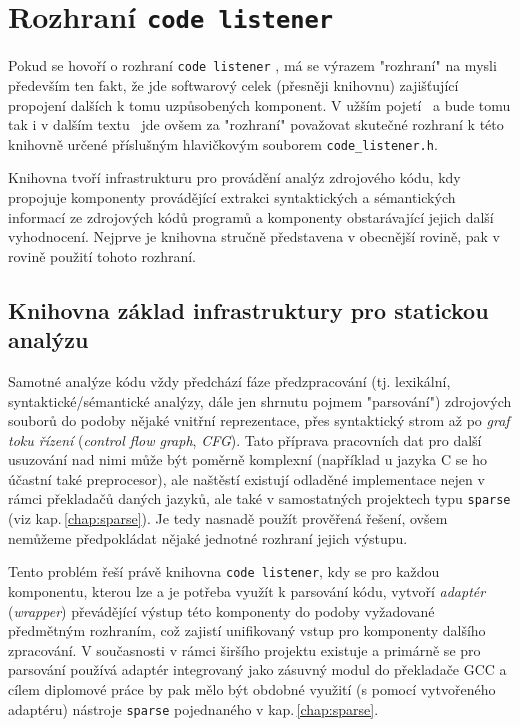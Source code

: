 \chapter{Rozhraní \texttt{code listener}}
\label{chap:code-listener}

Pokud se hovoří o rozhraní \texttt{code listener} \cite{web:FITVUTBR:VeriFIT:CodeListener},
má se výrazem "rozhraní" na mysli především ten fakt, že jde softwarový
celek (přesněji knihovnu) zajišťující propojení dalších k tomu uzpůsobených
komponent. V užším pojetí \ndash\ a bude tomu tak i v dalším textu \ndash\ jde ovšem
za "rozhraní" považovat skutečné rozhraní k této knihovně určené
příslušným hlavičkovým souborem \texttt{code\_listener.h}.

Knihovna tvoří infrastrukturu pro provádění analýz zdrojového kódu, kdy
propojuje komponenty provádějící extrakci syntaktických a sémantických
informací ze zdrojových kódů programů a komponenty obstarávající jejich
další vyhodnocení. Nejprve je knihovna stručně představena v obecnější rovině,
pak v rovině použití tohoto rozhraní.

\section{Knihovna základ infrastruktury pro statickou analýzu}

Samotné analýze kódu vždy předchází fáze předzpracování (tj. lexikální,
syntaktické/sémantické analýzy, dále jen shrnutu pojmem "parsování")
zdrojových souborů do podoby nějaké vnitřní reprezentace, přes syntaktický
strom až po \emph{graf toku řízení} (\emph{control flow graph}, \emph{CFG}).
Tato příprava pracovních dat pro další usuzování nad nimi může být
poměrně komplexní (například u jazyka C se ho účastní také preprocesor),
ale naštěstí existují odladěné implementace nejen v rámci překladačů
daných jazyků, ale také v samostatných projektech typu \texttt{sparse}
(viz kap.\,\ref{chap:sparse}). Je tedy nasnadě použít prověřená řešení, ovšem
nemůžeme předpokládat nějaké jednotné rozhraní jejich výstupu.

Tento problém řeší právě knihovna \texttt{code listener}, kdy se pro každou
komponentu, kterou lze a je potřeba využít k parsování kódu, vytvoří
\emph{adaptér} (\emph{wrapper}) převádějící výstup této komponenty
do podoby vyžadované předmětným rozhraním, což zajistí unifikovaný
vstup pro komponenty dalšího zpracování. V současnosti v rámci širšího
projektu existuje a primárně se pro parsování používá adaptér integrovaný
jako zásuvný modul do překladače GCC a cílem diplomové práce
by pak mělo být obdobné využití (s pomocí vytvořeného adaptéru) nástroje
\texttt{sparse} pojednaného v kap.\,\ref{chap:sparse}.

